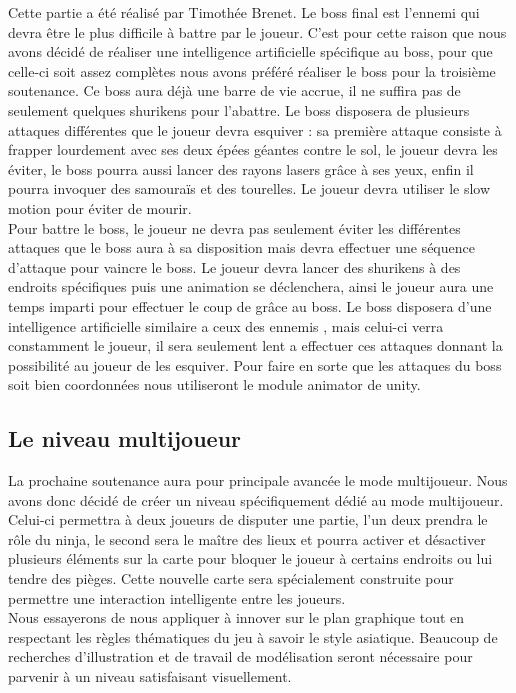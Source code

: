 \documentclass[12pt]{article}
\begin{document}
Cette partie a été réalisé par Timothée Brenet.
Le boss final est l'ennemi qui devra être le plus difficile à battre par le joueur. C'est pour cette raison que nous avons décidé de réaliser une intelligence artificielle spécifique au boss, pour que celle-ci soit assez complètes nous avons préféré réaliser le boss pour la troisième soutenance. Ce boss aura déjà une barre de vie accrue, il ne suffira pas de seulement quelques shurikens pour l'abattre. Le boss disposera de plusieurs attaques différentes que le joueur devra esquiver : sa première attaque consiste à frapper lourdement avec ses deux épées géantes contre le sol, le joueur devra les éviter, le boss pourra aussi lancer des rayons lasers grâce à ses yeux, enfin il pourra invoquer des samouraïs et des tourelles. Le joueur devra utiliser le slow motion pour éviter de mourir.\\
Pour battre le boss, le joueur ne devra pas seulement éviter les différentes attaques que le boss aura à sa disposition mais devra effectuer une séquence d'attaque pour vaincre le boss. Le joueur devra lancer des shurikens à des endroits spécifiques puis une animation se déclenchera, ainsi le joueur aura une temps imparti pour effectuer le coup de grâce au boss. Le boss disposera d'une intelligence artificielle similaire a ceux des ennemis , mais celui-ci verra constamment le joueur, il sera seulement lent a effectuer ces attaques donnant la possibilité au joueur de les esquiver. Pour faire en sorte que les attaques du boss soit bien coordonnées nous utiliseront le module animator de unity.

\subsection{Le niveau multijoueur}

La prochaine soutenance aura pour principale avancée le mode multijoueur. Nous avons donc décidé de créer un niveau spécifiquement dédié au mode multijoueur. Celui-ci permettra à deux joueurs de disputer une partie, l'un deux prendra le rôle du ninja, le second sera le maître des lieux et pourra activer et désactiver plusieurs éléments sur la carte pour bloquer le joueur à certains endroits ou lui tendre des pièges. Cette nouvelle carte sera spécialement construite pour permettre une interaction intelligente entre les joueurs.\\

Nous essayerons de nous appliquer à innover sur le plan graphique tout en respectant les règles thématiques du jeu à savoir le style asiatique. Beaucoup de recherches d'illustration et de travail de modélisation seront nécessaire pour parvenir à un niveau satisfaisant visuellement.\\
\end{document}
